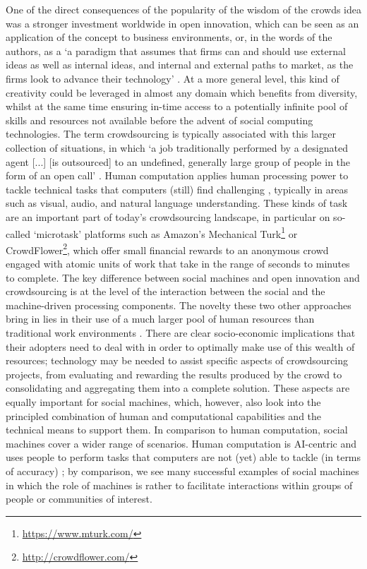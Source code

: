 \documentclass{sig-alternate}
\begin{document}
One of the direct consequences of the popularity of the wisdom of the crowds idea was a stronger investment worldwide in open innovation, which can be seen as an application of the concept to business environments, or, in the words of the authors, as a `a paradigm that assumes that firms can and should use external ideas as well as internal ideas, and internal and external paths to market, as the firms look to advance their technology' \cite{chesbrough2003}. At a more general level, this kind of creativity could be leveraged in almost any domain which benefits from diversity, whilst at the same time ensuring in-time access to a potentially infinite pool of skills and resources not available before the advent of social computing technologies. The term crowdsourcing is typically associated with this larger collection of situations, in which `a job traditionally performed by a designated agent [...] [is outsourced] to an undefined, generally large group of people in the form of an open call' \cite{howe2006crowdsourcing}. Human computation applies human processing power to tackle technical tasks that computers (still) find challenging \cite{von2009human}, typically in areas such as visual, audio, and natural language understanding. These kinds of task are an important part of today's crowdsourcing landscape, in particular on so-called `microtask' platforms such as Amazon's Mechanical Turk\footnote{\url{https://www.mturk.com/}} or CrowdFlower\footnote{\url{http://crowdflower.com/}}, which offer small financial rewards to an anonymous crowd engaged with atomic units of work that take in the range of seconds to minutes to complete. The key difference between social machines and open innovation and crowdsourcing is at the level of the interaction between the social and the machine-driven processing components. The novelty these two other approaches bring in lies in their use of a much larger pool of human resources than traditional work environments \cite{quinn2011human}. There are clear socio-economic implications that their adopters need to deal with in order to optimally make use of this wealth of resources; technology may be needed to assist specific aspects of crowdsourcing projects, from evaluating and rewarding the results produced by the crowd to consolidating and aggregating them into a complete solution. These aspects are equally important for social machines, which, however, also look into the principled combination of human and computational capabilities and the technical means to support them. In comparison to human computation, social machines cover a wider range of scenarios. Human computation is AI-centric and uses people to perform tasks that computers are not (yet) able to tackle (in terms of accuracy) \cite{quinn2011human}; by comparison, we see many successful examples of social machines in which the role of machines is rather to facilitate interactions within groups of people or communities of interest.
\end{document}
